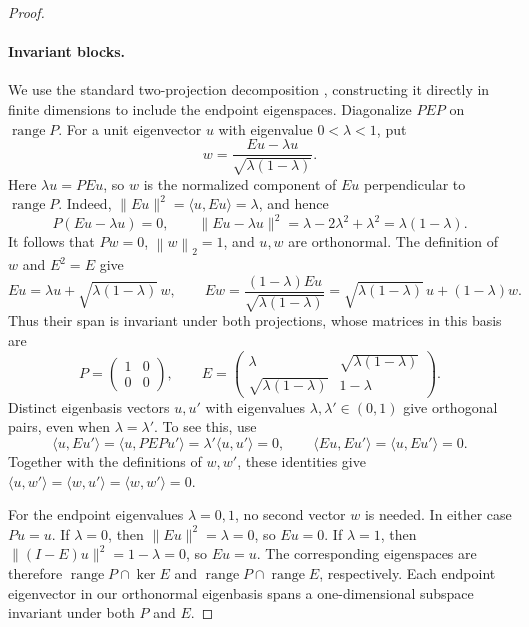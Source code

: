 \documentclass[11pt]{article}
\theoremstyle{definition}
\theoremstyle{remark}
\theoremstyle{plain}
\newcommand{\norm}[1]{\left\lVert#1\right\rVert_2}
\begin{document}
\begin{proof}
\paragraph{Invariant blocks.}
We use the standard two-projection decomposition
\cite[Theorem~2]{halmos1969}, constructing it directly in finite
dimensions to include the endpoint eigenspaces.
Diagonalize \(PEP\) on \(\operatorname{range}P\).
For a unit eigenvector \(u\) with eigenvalue \(0<\lambda<1\), put
\[
 w=\frac{Eu-\lambda u}{\sqrt{\lambda(1-\lambda)}}.
\]
Here \(\lambda u=PEu\), so \(w\) is the normalized component of
\(Eu\) perpendicular to \(\operatorname{range}P\).
Indeed, \(\|Eu\|^2=\langle u,Eu\rangle=\lambda\), and hence
\[
 P(Eu-\lambda u)=0,\qquad
 \|Eu-\lambda u\|^2=\lambda-2\lambda^2+\lambda^2
                         =\lambda(1-\lambda).
\]
It follows that \(Pw=0\), \(\norm w=1\), and \(u,w\) are orthonormal.
The definition of \(w\) and \(E^2=E\) give
\[
 Eu=\lambda u+\sqrt{\lambda(1-\lambda)}\,w,\qquad
 Ew=\frac{(1-\lambda)Eu}{\sqrt{\lambda(1-\lambda)}}
    =\sqrt{\lambda(1-\lambda)}\,u+(1-\lambda)w.
\]
Thus their span is invariant under both projections, whose matrices
in this basis are
\begin{equation}\label{eq:two-projection-block}
 P=\begin{pmatrix}1&0\\0&0\end{pmatrix},\qquad
 E=\begin{pmatrix}\lambda&\sqrt{\lambda(1-\lambda)}\\
                  \sqrt{\lambda(1-\lambda)}&1-\lambda\end{pmatrix}.
\end{equation}
Distinct eigenbasis vectors \(u,u'\) with eigenvalues
\(\lambda,\lambda'\in(0,1)\) give orthogonal pairs, even when
\(\lambda=\lambda'\). To see this, use
\[
 \langle u,Eu'\rangle
   =\langle u,PEPu'\rangle
   =\lambda'\langle u,u'\rangle=0,\qquad
 \langle Eu,Eu'\rangle=\langle u,Eu'\rangle=0.
\]
Together with the definitions of \(w,w'\), these identities give
\(\langle u,w'\rangle=\langle w,u'\rangle=\langle w,w'\rangle=0\).

For the endpoint eigenvalues \(\lambda=0,1\), no second vector \(w\)
is needed. In either case \(Pu=u\). If \(\lambda=0\), then
\(\|Eu\|^2=\lambda=0\), so \(Eu=0\). If \(\lambda=1\), then
\(\|(I-E)u\|^2=1-\lambda=0\), so \(Eu=u\).
The corresponding eigenspaces are therefore
\(\operatorname{range}P\cap\ker E\) and
\(\operatorname{range}P\cap\operatorname{range}E\), respectively.
Each endpoint eigenvector in our orthonormal eigenbasis spans a
one-dimensional subspace invariant under both \(P\) and \(E\).


\end{proof}
\end{document}
